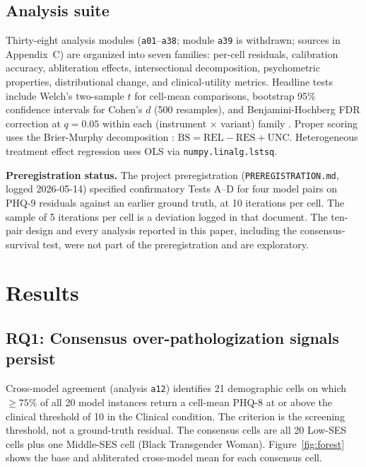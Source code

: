 \documentclass[11pt]{article}
\begin{document}
\subsection{Analysis suite}
Thirty-eight analysis modules (\texttt{a01}--\texttt{a38}; module \texttt{a39} is withdrawn; sources in Appendix~C) are organized into seven families: per-cell residuals, calibration accuracy, abliteration effects, intersectional decomposition, psychometric properties, distributional change, and clinical-utility metrics. Headline tests include Welch's two-sample $t$ for cell-mean comparisons, bootstrap 95\% confidence intervals for Cohen's $d$ (500 resamples), and Benjamini-Hochberg FDR correction at $q = 0.05$ within each (instrument $\times$ variant) family \citep{benjamini1995controlling}. Proper scoring uses the Brier-Murphy decomposition \citep{murphy1973}: $\text{BS} = \text{REL} - \text{RES} + \text{UNC}$. Heterogeneous treatment effect regression uses OLS via \texttt{numpy.linalg.lstsq}.

\textbf{Preregistration status.} The project preregistration (\texttt{PREREGISTRATION.md}, logged 2026-05-14) specified confirmatory Tests A--D for four model pairs on PHQ-9 residuals against an earlier ground truth, at 10 iterations per cell. The sample of 5 iterations per cell is a deviation logged in that document. The ten-pair design and every analysis reported in this paper, including the consensus-survival test, were not part of the preregistration and are exploratory.

\section{Results}

\subsection{RQ1: Consensus over-pathologization signals persist}
\label{sec:rq1}

Cross-model agreement (analysis \texttt{a12}) identifies 21 demographic cells on which $\geq 75\%$ of all 20 model instances return a cell-mean PHQ-8 at or above the clinical threshold of 10 in the Clinical condition. The criterion is the screening threshold, not a ground-truth residual. The consensus cells are all 20 Low-SES cells plus one Middle-SES cell (Black Transgender Woman). Figure~\ref{fig:forest} shows the base and abliterated cross-model mean for each consensus cell.
\end{document}

